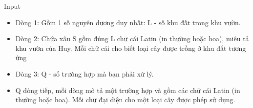Input
\begin{itemize}
	\item Dòng 1: Gồm 1 số nguyên dương duy nhất: L - số khu đất trong khu vườn.
	\item Dòng 2: Chứa xâu S gồm đúng L chữ cái Latin (in thường hoặc hoa), miêu tả khu vườn của Huy. Mỗi chữ cái cho biết loại cây được trồng ở khu đất tương ứng
	\item Dòng 3: Q - số trường hợp mà bạn phải xứ lý.
	\item Q dòng tiếp, mỗi dòng mô tả một trường hợp và gồm các chữ cái Latin (in thường hoặc hoa). Mỗi chữ đại diện cho một loại cây được phép sử dụng.
\end{itemize}